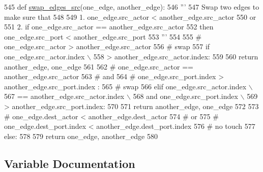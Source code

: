 \begin{DoxyCode}
545     \textcolor{keyword}{def }\hyperlink{namespacesylva_1_1glic_1_1glic_a6e0ff8a8e5ef9956ef0b31be0fb0bf0e}{swap\_edges\_src}(one\_edge, another\_edge):
546         \textcolor{stringliteral}{'''}
547 \textcolor{stringliteral}{          Swap two edges to make sure that}
548 \textcolor{stringliteral}{}
549 \textcolor{stringliteral}{          1. one\_edge.src\_actor < another\_edge.src\_actor}
550 \textcolor{stringliteral}{          or}
551 \textcolor{stringliteral}{          2. if one\_edge.src\_actor == another\_edge.src\_actor}
552 \textcolor{stringliteral}{             then one\_edge.src\_port < another\_edge.src\_port}
553 \textcolor{stringliteral}{        '''}
554 
555         \textcolor{comment}{# one\_edge.src\_actor > another\_edge.src\_actor}
556         \textcolor{comment}{# swap}
557         \textcolor{keywordflow}{if} one\_edge.src\_actor.index \(\backslash\)
558                 > another\_edge.src\_actor.index:
559 
560             \textcolor{keywordflow}{return} another\_edge, one\_edge
561 
562         \textcolor{comment}{# one\_edge.src\_actor == another\_edge.src\_actor}
563         \textcolor{comment}{# and}
564         \textcolor{comment}{# one\_edge.src\_port.index > another\_edge.src\_port.index :}
565         \textcolor{comment}{# swap}
566         \textcolor{keywordflow}{elif} one\_edge.src\_actor.index \(\backslash\)
567             == another\_edge.src\_actor.index \(\backslash\)
568             \textcolor{keywordflow}{and} one\_edge.src\_port.index \(\backslash\)
569                 > another\_edge.src\_port.index:
570 
571             \textcolor{keywordflow}{return} another\_edge, one\_edge
572 
573         \textcolor{comment}{# one\_edge.dest\_actor < another\_edge.dest\_actor}
574         \textcolor{comment}{# or}
575         \textcolor{comment}{# one\_edge.dest\_port.index < another\_edge.dest\_port.index}
576         \textcolor{comment}{# no touch}
577         \textcolor{keywordflow}{else}:
578 
579             \textcolor{keywordflow}{return} one\_edge, another\_edge
580 
\end{DoxyCode}


\subsection{Variable Documentation}
\mbox{\label{namespacesylva_1_1glic_1_1glic_a57d291e9c4a03b4cd7a7bee3615beab0}} 
